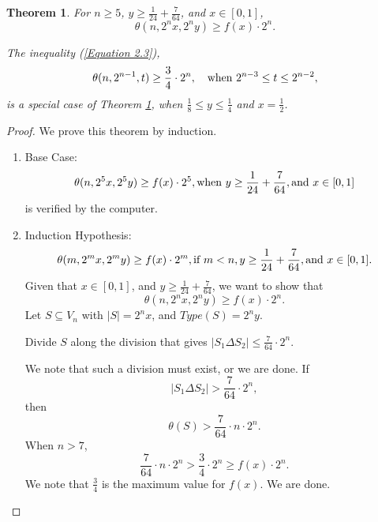 \documentclass[12pt]{ucthesis}
\theoremstyle{plain}
\newtheorem{theorem}{Theorem}
\theoremstyle{definition}
\begin{document}
\begin{theorem}
\label{Theorem 3}
For $n \ge 5$, $y \ge \frac{1}{24} + \frac{7}{64}$, and $x \in [0, 1]$,
\begin{equation*}
\theta(n, 2^n x, 2^n y) \ge f(x) \cdot 2^n.
\end{equation*}

The inequality (\ref{Equation 2.3}),
\begin{equation*}
\theta(n, 2^{n - 1}, t) \ge \frac{3}{4} \cdot 2^n, \quad
\textnormal{when } 2^{n - 3} \le t \le 2^{n - 2},
\end{equation*}
is a special case of Theorem \ref{Theorem 3},
when $\frac{1}{8} \le y \le \frac{1}{4}$ and $x = \frac{1}{2}$.
\end{theorem}
\begin{proof}
We prove this theorem by induction.
\begin{enumerate}[(1)]
\item Base Case:
	\begin{equation*}
	\theta(n, 2^5 x, 2^5 y) \ge f(x) \cdot 2^5,
	\textnormal{when } y \ge \frac{1}{24} + \frac{7}{64},
	\textnormal{and } x \in [0, 1]
	\end{equation*}
	is verified by the computer.
\item Induction Hypothesis:
	\begin{equation*}
	\theta(m, 2^m x, 2^m y) \ge f(x) \cdot 2^m,
	\textnormal{if } m < n, y \ge \frac{1}{24} + \frac{7}{64},
	\textnormal{and } x \in [0, 1].
	\end{equation*}
	Given that $x \in [0, 1]$, and $y \ge \frac{1}{24} + \frac{7}{64}$,
	we want to show that
	\begin{equation*}
	\theta(n, 2^n x, 2^n y) \ge f(x) \cdot 2^n.
	\end{equation*}
	Let $S \subseteq V_n$ with $|S| = 2^n x$, and $Type(S) = 2^n y$.

	Divide $S$ along the division that gives $|S_1 \Delta S_2| \le \frac{7}{64} \cdot 2^n$.

	We note that such a division must exist, or we are done.
	If
	\begin{equation*}
	|S_1 \Delta S_2| > \frac{7}{64} \cdot 2^n,
	\end{equation*}
	then
	\begin{equation*}
	\theta(S) > \frac{7}{64} \cdot n \cdot 2^n.
	\end{equation*}
	When $n > 7$,
	\begin{equation*}
	\frac{7}{64} \cdot n \cdot 2^n > \frac{3}{4} \cdot 2^n \ge f(x) \cdot 2^n.
	\end{equation*}
	We note that $\frac{3}{4}$ is the maximum value for $f(x)$.
	We are done.


\end{enumerate}
\end{proof}
\end{document}
